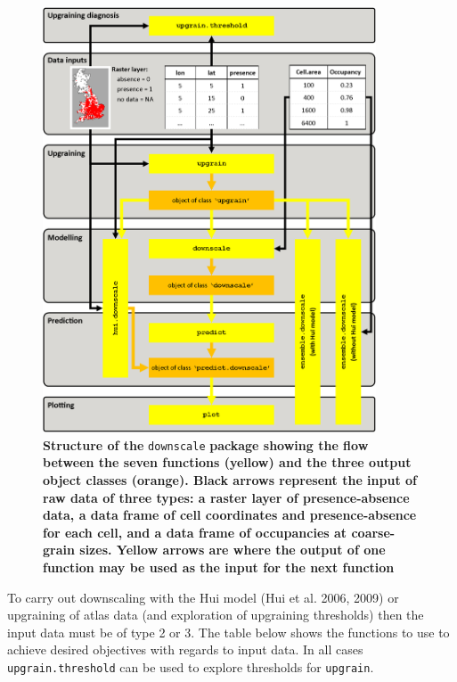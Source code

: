 \documentclass{article}[12pt, a4paper]
\begin{document}
\begin{figure}[!ht]
\centering
\includegraphics[width=9.9cm]{Flow.png}
\caption{\textbf{Structure of the} \texttt{downscale} \textbf{package showing the flow between the seven functions (yellow) and the three output object classes (orange). Black arrows represent the input of raw data of three types: a raster layer of presence-absence data, a data frame of cell coordinates and presence-absence for each cell, and a data frame of occupancies at coarse-grain sizes. Yellow arrows are where the output of one function may be used as the input for the next function}}
\label{fig:Flow}
\end{figure}

\newpage
To carry out downscaling with the Hui model (Hui et al. 2006, 2009) or upgraining of atlas data (and exploration of upgraining thresholds) then the input data must be of type 2 or 3. The table below shows the functions to use to achieve desired objectives with regards to input data. In all cases \texttt{upgrain.threshold} can be used to explore thresholds for \texttt{upgrain}.
\end{document}
